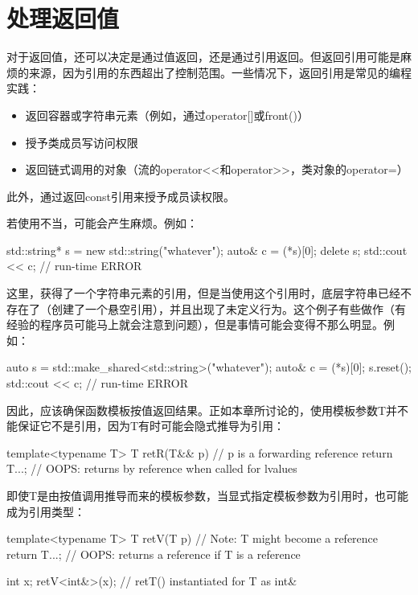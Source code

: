 \section{处理返回值}


对于返回值，还可以决定是通过值返回，还是通过引用返回。但返回引用可能是麻烦的来源，因为引用的东西超出了控制范围。一些情况下，返回引用是常见的编程实践：

\begin{itemize}
\item 
返回容器或字符串元素（例如，通过operator[]或front()）

\item 
授予类成员写访问权限

\item 
返回链式调用的对象（流的operator<{}<和operator>{}>，类对象的operator=）
\end{itemize}

此外，通过返回const引用来授予成员读权限。

若使用不当，可能会产生麻烦。例如：

\begin{cpp}
std::string* s = new std::string("whatever");
auto& c = (*s)[0];
delete s;
std::cout << c; // run-time ERROR
\end{cpp}

这里，获得了一个字符串元素的引用，但是当使用这个引用时，底层字符串已经不存在了（创建了一个悬空引用），并且出现了未定义行为。这个例子有些做作（有经验的程序员可能马上就会注意到问题），但是事情可能会变得不那么明显。例如：

\begin{cpp}
auto s = std::make_shared<std::string>("whatever");
auto& c = (*s)[0];
s.reset();
std::cout << c; // run-time ERROR
\end{cpp}

因此，应该确保函数模板按值返回结果。正如本章所讨论的，使用模板参数T并不能保证它不是引用，因为T有时可能会隐式推导为引用：

\begin{cpp}
template<typename T>
T retR(T&& p) // p is a forwarding reference
{
	return T{...}; // OOPS: returns by reference when called for lvalues
}
\end{cpp}

即使T是由按值调用推导而来的模板参数，当显式指定模板参数为引用时，也可能成为引用类型：

\begin{cpp}
template<typename T>
T retV(T p) // Note: T might become a reference
{
	return T{...}; // OOPS: returns a reference if T is a reference
}

int x;
retV<int&>(x); // retT() instantiated for T as int&
\end{cpp}

